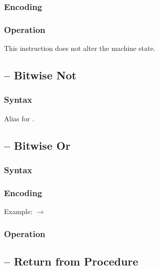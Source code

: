 \documentclass[a4paper,12pt,twoside,extrafontsizes]{memoir}
\begin{document}
{

\subsubsection{Encoding}


\subsubsection{Operation}

This instruction does not alter the machine state.

\subsection{ -- Bitwise Not}
\label{subsec:instr:not}

\subsubsection{Syntax}


Alias for .

\subsection{ -- Bitwise Or}
\label{subsec:instr:or}

\subsubsection{Syntax}


\subsubsection{Encoding}


Example:  $\rightarrow$ 

\subsubsection{Operation}


\subsection{ -- Return from Procedure}
\label{subsec:instr:ret}

}
\end{document}
